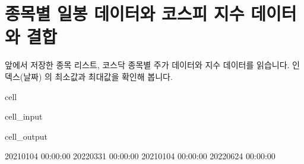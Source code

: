 \documentclass[letterpaper,10pt,english]{jupyterBook}
\begin{document}
\section{종목별 일봉 데이터와 코스피 지수 데이터와 결합}
\label{\detokenize{chapter4/4.4.3_Data_Collection:id1}}\label{\detokenize{chapter4/4.4.3_Data_Collection::doc}}
\sphinxAtStartPar
앞에서 저장한 종목 리스트, 코스닥 종목별 주가 데이터와 지수 데이터를 읽습니다. 인덱스(날짜) 의 최소값과 최대값을 확인해 봅니다.

\begin{sphinxuseclass}{cell}\begin{sphinxVerbatimInput}

\begin{sphinxuseclass}{cell_input}
\begin{sphinxVerbatim}[commandchars=\\\{\}]
   
   
   

 
 
\end{sphinxVerbatim}

\end{sphinxuseclass}\end{sphinxVerbatimInput}
\begin{sphinxVerbatimOutput}

\begin{sphinxuseclass}{cell_output}
\begin{sphinxVerbatim}[commandchars=\\\{\}]
2021\PYGZhy{}01\PYGZhy{}04 00:00:00 2022\PYGZhy{}03\PYGZhy{}31 00:00:00
2021\PYGZhy{}01\PYGZhy{}04 00:00:00 2022\PYGZhy{}06\PYGZhy{}24 00:00:00
\end{sphinxVerbatim}

\end{sphinxuseclass}\end{sphinxVerbatimOutput}

\end{sphinxuseclass}
\end{document}
